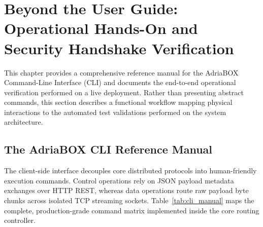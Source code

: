 \section{Beyond the User Guide: Operational Hands-On and Security Handshake Verification}
\label{sec:user_guide}

This chapter provides a comprehensive reference manual for the AdriaBOX Command-Line Interface (CLI) and documents the end-to-end operational verification performed on a live deployment. Rather than presenting abstract commands, this section describes a functional workflow mapping physical interactions to the automated test validations performed on the system architecture.

\subsection{The AdriaBOX CLI Reference Manual}
The client-side interface decouples core distributed protocols into human-friendly execution commands. Control operations rely on JSON payload metadata exchanges over HTTP REST, whereas data operations route raw payload byte chunks across isolated TCP streaming sockets. Table~\ref{tab:cli_manual} maps the complete, production-grade command matrix implemented inside the core routing controller.

